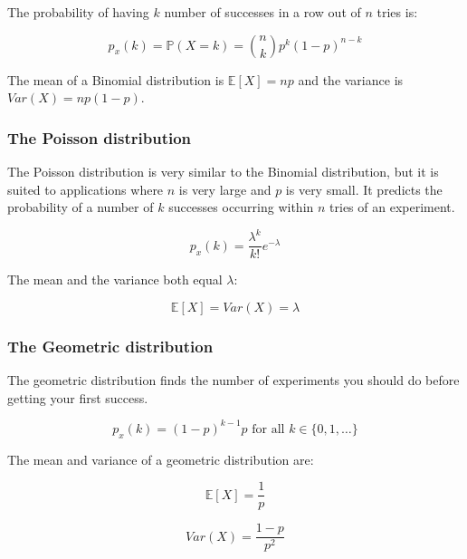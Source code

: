 The probability of having $k$ number of successes in a row out of $n$ tries is:

\begin{dmath*}
	{p_x(k) = \mathbb{P}(X = k) = {n \choose k}p^k(1-p)^{n-k}}
\end{dmath*}

The mean of a Binomial distribution is $\mathbb{E}[X] = np$ and the variance is
$Var(X) = np(1-p)$.

\subsubsection{The Poisson distribution}

The Poisson distribution is very similar to the Binomial distribution, but it is
suited to applications where $n$ is very large and $p$ is very small. It
predicts the probability of a number of $k$ successes occurring within $n$ tries
of an experiment.

\begin{dmath*}
	p_x(k) = \frac{\lambda^k}{k!}e^{-\lambda}
\end{dmath*}

The mean and the variance both equal $\lambda$:

\begin{dmath*}
	{\mathbb{E}[X] = Var(X) = \lambda}
\end{dmath*}

\subsubsection{The Geometric distribution}

The geometric distribution finds the number of experiments you should do before
getting your first success.

\begin{dmath*}
	p_x(k) = (1-p)^{k-1}p \textrm{ for all $k \in \{0, 1, \dots\}$}
\end{dmath*}

The mean and variance of a geometric distribution are:

\begin{dmath*}
	\mathbb{E}[X] = \frac{1}{p}
\end{dmath*}

\begin{dmath*}
	Var(X) = \frac{1-p}{p^2}
\end{dmath*}
